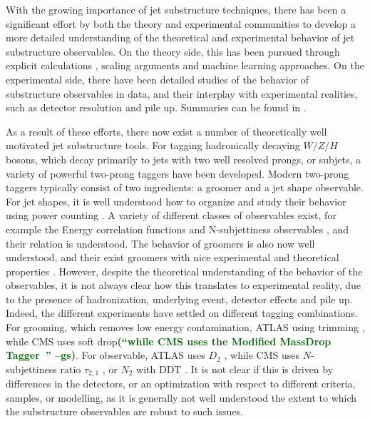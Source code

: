 \documentclass[11pt,letterpaper]{article}
\newcommand{\gs}[1]{\textbf{\textcolor{darkgreen}{(#1 --gs)}}}
\begin{document}
 
 With the growing importance of jet substructure techniques, there has been a significant effort by both the theory and experimental communities to develop a more detailed understanding of the theoretical and experimental behavior of jet substructure observables. On the theory side, this has been pursued through explicit calculations \cite{Feige:2012vc,Field:2012rw,Dasgupta:2013ihk,Dasgupta:2013via,Larkoski:2014pca,Dasgupta:2015yua,Seymour:1997kj,Li:2011hy,Larkoski:2012eh,Jankowiak:2012na,Chien:2014nsa,Chien:2014zna,Isaacson:2015fra,Krohn:2012fg,Waalewijn:2012sv,Larkoski:2014tva,Procura:2014cba,Bertolini:2015pka,Bhattacherjee:2015psa,Larkoski:2015kga,Dasgupta:2015lxh,Frye:2016okc,Frye:2016aiz,Kang:2016ehg,Hornig:2016ahz,Marzani:2017mva}, scaling arguments \cite{Walsh:2011fz,Larkoski:2014gra,Larkoski:2014zma} and machine learning \cite{Cogan:2014oua,deOliveira:2015xxd,Almeida:2015jua,Baldi:2016fql,Guest:2016iqz,Conway:2016caq,Barnard:2016qma} approaches. On the experimental side, there have been detailed studies of the behavior of substructure observables in data, and their interplay with experimental realities, such as detector resolution and pile up. Summaries can be found in \cite{Abdesselam:2010pt,Altheimer:2012mn,Altheimer:2013yza,Adams:2015hiv}.

As a result of these efforts, there now exist a number of theoretically well motivated jet substructure tools. For tagging hadronically decaying $W/Z/H$ bosons, which decay primarily to jets with two well resolved prongs, or subjets, a variety of powerful two-prong taggers have been developed.  Modern two-prong taggers typically consist of two ingredients: a groomer and a jet shape observable.
For jet shapes, it is well understood how to organize and study their
behavior using power counting \cite{Larkoski:2014gra}. A variety of
different classes of observables exist, for example the Energy
correlation functions \cite{Larkoski:2013eya} and N-subjettiness
observables \cite{Thaler:2010tr,Thaler:2011gf}, and their relation is
understood. The behavior of groomers is also now well understood, and
their exist groomers with nice experimental and theoretical properties
\cite{Dasgupta:2013ihk,Larkoski:2014wba}. However, despite the
theoretical understanding of the behavior of the observables, it is
not always clear how this translates to experimental reality, due to
the presence of hadronization, underlying event, detector effects and
pile up. Indeed, the different experiments have settled on different
tagging combinations. For grooming, which removes low energy
contamination,  ATLAS using trimming \cite{Krohn:2009th}, while CMS
uses soft drop\cite{Larkoski:2014wba}\gs{``while CMS uses the Modified
  MassDrop Tagger~\cite{Dasgupta:2013ihk}''}. For observable, ATLAS uses $D_2$ \cite{Larkoski:2014gra,Larkoski:2015kga}, while CMS uses $N$-subjettiness ratio $\tau_{2,1}$ \cite{Thaler:2010tr,Thaler:2011gf}, or $N_2$ \cite{Moult:2016cvt} with DDT \cite{Dolen:2016kst}. It is not clear if this is driven by differences in the detectors, or an optimization with respect to different criteria, samples, or modelling, as it is generally not well understood the extent to which the substructure observables are robust to such issues.
\end{document}
